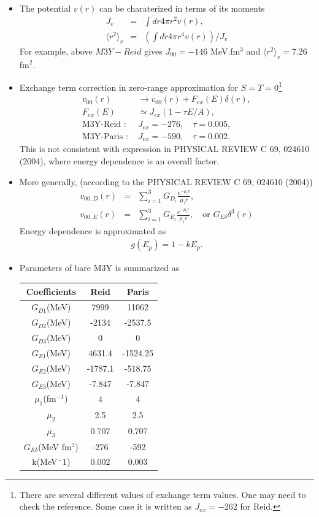 \documentclass[11pt]{book}
\def\la{\langle}
\def\ra{\rangle}
\newcommand{\bea}{\begin{eqnarray}}
\newcommand{\eea}{\end{eqnarray}}
\newcommand{\no}{\nonumber \\}
\begin{document}
\begin{itemize}
	\item The potential $v(r)$ can be charaterized in terms of its moments
	  \bea 
	  J_v &=& \int dr 4\pi r^2 v(r) ,\no 
	  \la r^2\ra _{v} &=& \left( \int dr 4\pi r^4 v(r) \right) / J_v 
	  \eea 
	  For example, above $M3Y-Reid$ gives $J_{00}=-146$ MeV.fm$^3$ and $\la r^2\ra_v=7.26$ fm$^2$.
	\item Exchange term correction in zero-range approximation for $S=T=0$\footnote{
		There are several different values of exchange term values. One may need to check the reference.
		Some case it is written as $J_{ex}=-262$ for Reid. 
	}
	\bea 
	v_{00}(r)&\to v_{00}(r)+F_{ex}(E) \delta(r) ,\no 
	F_{ex}(E)&\simeq J_{ex}(1-\tau E/A) ,\no 
	\mbox{M3Y-Reid : }&  J_{ex}=-276,\quad \tau=0.005 ,\no 
	\mbox{M3Y-Paris : }&  J_{ex}=-590, \quad \tau=0.002.
	\eea 
	This is not consistent with expression in PHYSICAL REVIEW C 69, 024610 (2004),
	where energy dependence is an overall factor.
	
	
	\item More generally, (according to the PHYSICAL REVIEW C 69, 024610 (2004))
	\bea 
	v_{00,D}(r) &=& \sum_{i=1}^3 G_{D_i} \frac{e^{-\mu_i r}}{\mu_i r},\no  
	v_{00,E}(r) &=& \sum_{i=1}^3 G_{E_i} \frac{e^{-\mu_i r}}{\mu_i r},\quad \mbox{or } G_{E\delta}\delta^3(r)  
	\eea 
	Energy dependence is approximated as
	\bea 
	g(E_p)= 1- k E_p.
	\eea 
	
	\item Parameters of bare M3Y is summarized as
	
	\begin{tabular}{|c|c|c|}
		\hline 
		Coefficients & Reid & Paris \\ 
		\hline 
		$G_{D1}$(MeV) & 7999 & 11062 \\ 
		\hline 
		$G_{D2}$(MeV) & -2134 & -2537.5 \\ 
		\hline 
		$G_{D3}$(MeV) & 0 & 0 \\ 
		\hline 
		$G_{E1}$(MeV) & 4631.4 & -1524.25 \\ 
		\hline 
		$G_{E2}$(MeV) & -1787.1 & -518.75 \\ 
		\hline 
		$G_{E3}$(MeV) & -7.847 & -7.847 \\ 
		\hline 
		$\mu_1$(fm$^{-1}$) & 4 & 4 \\ 
		\hline 
		$\mu_2$ & 2.5 & 2.5 \\ 
		\hline 
		$\mu_3$ & 0.707 & 0.707 \\ 
		\hline 
		$G_{E\delta}$(MeV fm$^3$) & -276 & -592 \\ 
		\hline 
		k(MeV$^-1$) & 0.002 & 0.003 \\ 
		\hline 		
	\end{tabular} 
	

\end{itemize}
\end{document}
